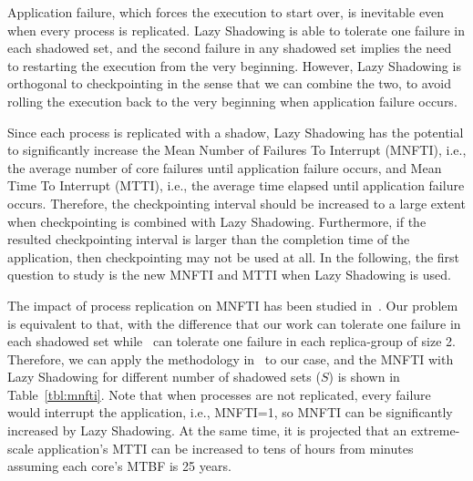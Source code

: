 Application failure, which forces the execution to start over, is inevitable even when every process is replicated. Lazy Shadowing is able to 
tolerate one failure in each shadowed set, and the second failure in any shadowed set implies the need to restarting the execution from the very beginning. However, Lazy Shadowing is orthogonal to checkpointing in 
the sense that we can combine the two, to avoid rolling the execution back to the very beginning when application failure occurs.

Since each process is replicated with a shadow, Lazy Shadowing has the potential to significantly 
increase the Mean Number of Failures To Interrupt (MNFTI), i.e., the average number of core failures until application failure occurs, and Mean Time To Interrupt (MTTI), i.e., the average time elapsed until application failure occurs. 
Therefore, the checkpointing interval should be increased to a large extent when checkpointing is combined with Lazy Shadowing. Furthermore, if the resulted checkpointing interval is 
larger than the completion time of the application, then checkpointing may not be used at
all. 
In the following, the first question to study is the new MNFTI and MTTI when Lazy Shadowing is used. 


The impact of process replication on MNFTI has been studied in~\cite{casanova_inria_2012}. Our problem
is equivalent to that, with the difference that our work can tolerate one failure in each shadowed 
set while~\cite{casanova_inria_2012} can tolerate one failure in each replica-group of size 2. 
Therefore, we can apply the methodology in~\cite{casanova_inria_2012} to our case, and the MNFTI
with Lazy Shadowing for different number of shadowed sets ($S$) is shown in Table~\ref{tbl:mnfti}. 
Note that when processes are not replicated, every failure would interrupt the application, i.e., MNFTI=1, so MNFTI can be significantly increased by Lazy Shadowing. 
At the same time, it is projected that an extreme-scale application's MTTI can be increased to tens of hours from minutes assuming each core's MTBF is 25 years.

